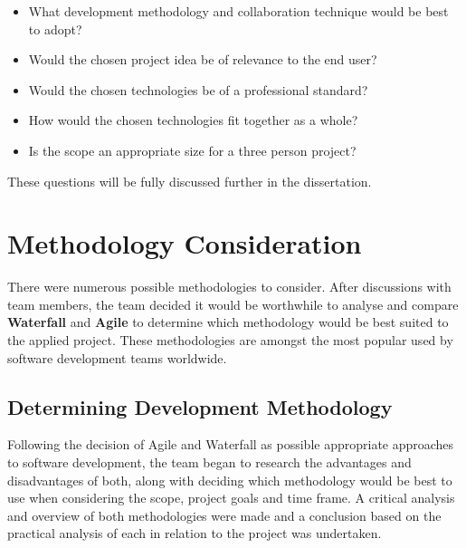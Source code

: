 \begin{itemize}

    \item {What development methodology and collaboration technique would be best to adopt?}

    \item{Would the chosen project idea be of relevance to the end user?}

     \item{Would the chosen technologies be of a professional standard?}

    \item{How would the chosen technologies fit together as a whole?}

    \item{Is the scope an appropriate size for a three person project?}

\end{itemize}

These questions will be fully discussed further in the dissertation.

\section{Methodology Consideration}
There were numerous possible methodologies to consider. After discussions with team members, the team decided it would be worthwhile to analyse and compare \textbf{Waterfall} and \textbf{Agile} to determine which methodology would be best suited to the applied project. These methodologies are amongst the most popular used by software development teams worldwide.
\vspace{5mm} %


\subsection{Determining Development Methodology}
Following the decision of Agile and Waterfall as possible appropriate approaches to software development, the team began to research the advantages and disadvantages of both, along with deciding which methodology would be best to use when considering the scope, project goals and time frame. A critical analysis and overview of both methodologies were made and a conclusion based on the practical analysis of each in relation to the project was undertaken.

